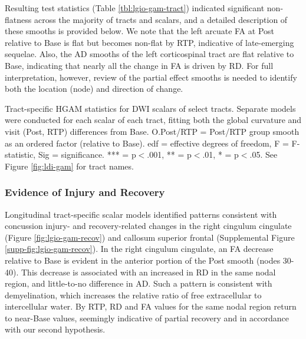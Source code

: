 \documentclass[12pt]{article}
\begin{document}
Resulting test statistics (Table \ref{tbl:lgio-gam-tract}) indicated significant non-flatness across the majority of tracts and scalars, and a detailed description of these smooths is provided below. We note that the left arcuate FA at Post relative to Base is flat but becomes non-flat by RTP, indicative of late-emerging sequelae. Also, the AD smooths of the left corticospinal tract are flat relative to Base, indicating that nearly all the change in FA is driven by RD. For full interpretation, however, review of the partial effect smooths is needed to identify both the location (node) and direction of change.

\begin{table}[H]
	\tiny
	
	\caption{Tract-specific HGAM statistics for DWI scalars of select tracts. Separate models were conducted for each scalar of each tract, fitting both the global curvature and visit (Post, RTP) differences from Base. O.Post/RTP = Post/RTP group smooth as an ordered factor (relative to Base). edf = effective degrees of freedom, F = F-statistic, Sig = significance. *** = p$<$.001, ** = p$<$.01, * = p$<$.05. See Figure \ref{fig:ldi-gam} for tract names.}
	\label{tbl:lgio-gam-tract}
\end{table}


\subsubsection{Evidence of Injury and Recovery}
\label{sssec:res-dwi-pat-recov}
Longitudinal tract-specific scalar models identified patterns consistent with concussion injury- and recovery-related changes in the right cingulum cingulate (Figure \ref{fig:lgio-gam-recov}) and callosum superior frontal (Supplemental Figure \ref{supp-fig:lgio-gam-recov}). In the right cingulum cingulate, an FA decrease relative to Base is evident in the anterior portion of the Post smooth (nodes 30-40). This decrease is associated with an increased in RD in the same nodal region, and little-to-no difference in AD. Such a pattern is consistent with demyelination, which increases the relative ratio of free extracellular to intercellular water. By RTP, RD and FA values for the same nodal region return to near-Base values, seemingly indicative of partial recovery and in accordance with our second hypothesis.
\end{document}

